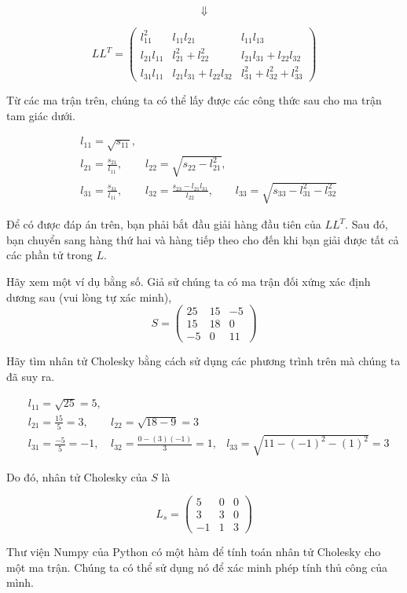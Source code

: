 \[\Downarrow \]

\[LL^{T}=\begin{pmatrix} l_{11}^{2} & l_{11}l_{21} & l_{11}l_{13} \\ l_{21}l_{11} & l_{21}^{2} + l_{22}^{2} & l_{21}l_{31}+l_{22}l_{32} \\ l_{31}l_{11} & l_{21}l_{31} + l_{22}l_{32} & l_{31}^{2}+l_{32}^{2}+l_{33}^{2} \end{pmatrix}\]

Từ các ma trận trên, chúng ta có thể lấy được các công thức sau cho ma trận tam giác dưới.

\[ \begin{matrix} & l_{11}=\sqrt{s_{11}}, & & \\ & l_{21}=\frac{s_{21}}{l_{11}}, & l_{22}=\sqrt{s_{22}-l_{21}^{2}}, & \\ & l_{31}=\frac{s_{31}}{l_{11}}, & l_{32}=\frac{s_{23}-l_{21}l_{31}}{l_{22}}, & l_{33}=\sqrt{s_{33}-l_{31}^{2}-l_{32}^{2}} \end{matrix} \]

Để có được đáp án trên, bạn phải bắt đầu giải hàng đầu tiên của $LL^{T}$. Sau đó, bạn chuyển sang hàng thứ hai và hàng tiếp theo cho đến khi bạn giải được tất cả các phần tử trong $L$.

Hãy xem một ví dụ bằng số. Giả sử chúng ta có ma trận đối xứng xác định dương sau (vui lòng tự xác minh), \[S =\begin{pmatrix} 25 & 15 & -5 \\ 15 & 18 & 0 \\ -5 & 0 & 11 \end{pmatrix}\]

Hãy tìm nhân tử Cholesky bằng cách sử dụng các phương trình trên mà chúng ta đã suy ra.

\[ \begin{matrix} & l_{11}=\sqrt{25}=5, & & \\ & l_{21}=\frac{15}{5}=3, & l_{22}=\sqrt{18-9}=3 \\ & l_{31}=\frac{-5}{5}=-1, & l_{32}=\frac{0-(3)(-1)}{3}=1, & l_{33}=\sqrt{11-(-1)^{2}-(1)^{2}}=3 \end{matrix} \]

Do đó, nhân tử Cholesky của $S$ là

\[L_{s} =\begin{pmatrix} 5 & 0 & 0 \\ 3 & 3 & 0 \\ -1 & 1 & 3 \end{pmatrix}\]

Thư viện Numpy của Python có một hàm để tính toán nhân tử Cholesky cho một ma trận. Chúng ta có thể sử dụng nó để xác minh phép tính thủ công của mình.

